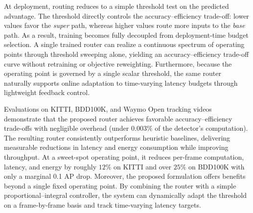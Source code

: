 At deployment, routing reduces to a simple threshold test on the predicted advantage. 
The threshold directly controls the accuracy--efficiency trade-off: lower values favor the \emph{super} path, whereas higher values route more inputs to the \emph{base} path. As a result, training becomes fully decoupled from deployment-time budget selection. A single trained router can realize a continuous spectrum of operating points through threshold sweeping alone, yielding an accuracy--efficiency trade-off curve without retraining or objective reweighting. Furthermore, because the operating point is governed by a single scalar threshold, the same router naturally supports online adaptation to time-varying latency budgets through lightweight feedback control.


Evaluations on KITTI, BDD100K, and Waymo Open tracking videos demonstrate that the proposed router achieves favorable accuracy--efficiency trade-offs with negligible overhead (under $0.003\%$ of the detector's computation).
The resulting router consistently outperforms heuristic baselines, delivering measurable reductions in latency and energy consumption while improving throughput.
At a sweet-spot operating point, it reduces per-frame computation, latency, and energy by roughly $12\%$ on KITTI and over $25\%$ on BDD100K with only a marginal 0.1 AP drop.
Moreover, the proposed formulation offers benefits beyond a single fixed operating point. 
By combining the router with a simple proportional--integral controller, the system can dynamically adapt the threshold on a frame-by-frame basis and track time-varying latency targets.
